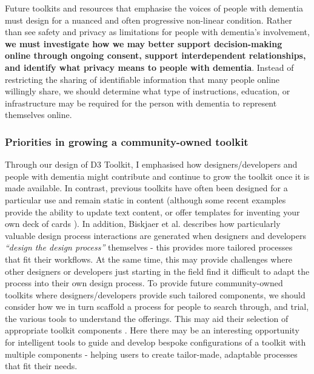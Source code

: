 Future toolkits and resources that emphasise the voices of people with dementia must design for a nuanced and often progressive non-linear condition. Rather than see safety and privacy as limitations for people with dementia's involvement, \textbf{we must investigate how we may better support decision-making online through ongoing consent, support interdependent relationships, and identify what privacy means to people with dementia}. Instead of restricting the sharing of identifiable information that many people online willingly share, we should determine what type of instructions, education, or infrastructure may be required for the person with dementia to represent themselves online. 

\subsubsection{Priorities in growing a community-owned toolkit}
Through our design of D3 Toolkit, I emphasised how designers/developers and people with dementia might contribute and continue to grow the toolkit once it is made available. In contrast, previous toolkits have often been designed for a particular use and remain static in content (although some recent examples provide the ability to update text content, or offer templates for inventing your own deck of cards \citep{garcia2019designing,mora2017tiles}). In addition, Biskjaer et al. describes how particularly valuable design process interactions are generated when designers and developers \textit{“design the design process”} \citep{mose2017understanding} themselves - this provides more tailored processes that fit their workflows. At the same time, this may provide challenges where other designers or developers just starting in the field find it difficult to adapt the process into their own design process. To provide future community-owned toolkits where designers/developers provide such tailored components, we should consider how we in turn scaffold a process for people to search through, and trial, the various tools to understand the offerings. This may aid their selection of appropriate toolkit components \citep{lee2021landscape}. Here there may be an interesting opportunity for intelligent tools to guide and develop bespoke configurations of a toolkit with multiple components - helping users to create tailor-made, adaptable processes that fit their needs. 

